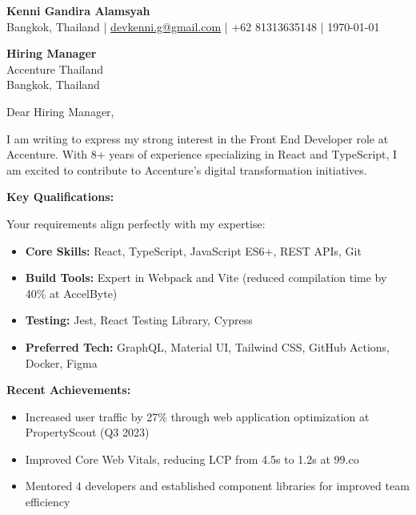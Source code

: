 \documentclass[11pt]{article}
\begin{document}
\begin{flushleft}
\textbf{\Large Kenni Gandira Alamsyah}\\
Bangkok, Thailand | \href{mailto:devkenni.g@gmail.com}{devkenni.g@gmail.com} | +62 81313635148 | \today
\end{flushleft}

\vspace{0.5cm}

\begin{flushleft}
\textbf{Hiring Manager}\\
Accenture Thailand\\
Bangkok, Thailand
\end{flushleft}

\vspace{0.5cm}

Dear Hiring Manager,

\vspace{0.3cm}

I am writing to express my strong interest in the Front End Developer role at Accenture. With 8+ years of experience specializing in React and TypeScript, I am excited to contribute to Accenture's digital transformation initiatives.

\vspace{0.3cm}

\textbf{Key Qualifications:}

Your requirements align perfectly with my expertise:
\begin{itemize}
    \setlength\itemsep{0.1em}
    \item \textbf{Core Skills:} React, TypeScript, JavaScript ES6+, REST APIs, Git
    \item \textbf{Build Tools:} Expert in Webpack and Vite (reduced compilation time by 40\% at AccelByte)
    \item \textbf{Testing:} Jest, React Testing Library, Cypress
    \item \textbf{Preferred Tech:} GraphQL, Material UI, Tailwind CSS, GitHub Actions, Docker, Figma
\end{itemize}

\vspace{0.3cm}

\textbf{Recent Achievements:}
\begin{itemize}
    \setlength\itemsep{0.1em}
    \item Increased user traffic by 27\% through web application optimization at PropertyScout (Q3 2023)
    \item Improved Core Web Vitals, reducing LCP from 4.5s to 1.2s at 99.co
    \item Mentored 4 developers and established component libraries for improved team efficiency
\end{itemize}
\end{document}
